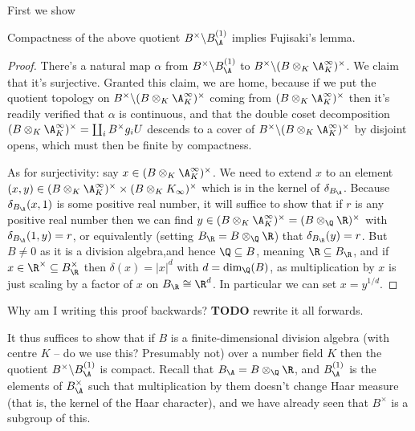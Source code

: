 First we show
\begin{lemma}
  \label{FiniteAdeleRing.DivisionAlgebra.finite_doset_of_compact_quotient}
  Compactness of the above quotient $B^\times\backslash B_{\A}^{(1)}$ implies Fujisaki's lemma.
\end{lemma}
\begin{proof}
  There's a natural map $\alpha$ from $B^\times\backslash B_{\A}^{(1)}$ to
  $B^\times\backslash (B\otimes_K \A_K^\infty)^\times$. We claim that it's
  surjective. Granted this claim, we are home, because if we put the quotient
  topology on $B^\times\backslash (B\otimes_K \A_K^\infty)^\times$ coming from
  $(B\otimes_K \A_K^\infty)^\times$ then it's readily verified that $\alpha$
  is continuous, and that the double coset decomposition
  $(B\otimes_K \A_K^\infty)^\times=\coprod_i B^\times g_i U$ descends to a
  cover of $B^\times\backslash (B\otimes_K \A_K^\infty)^\times$ by disjoint opens,
  which must then be finite by compactness.

  As for surjectivity: say $x\in (B\otimes_K \A_K^\infty)^\times$. We need to extend
  $x$ to an element $(x,y)\in (B\otimes_K \A_K^\infty)^\times\times(B\otimes_K K_\infty)^\times$
  which is in the kernel of $\delta_{B_{\A}}$. Because $\delta_{B_{\A}}(x,1)$ is some positive
  real number, it will suffice to show that if $r$ is any positive real number then we can
  find $y\in (B\otimes_K \A_K^\infty)^\times=(B\otimes_{\Q}\R)^\times$ with $\delta_{B_{\A}}(1,y)=r$,
  or equivalently (setting $B_{\R}=B\otimes_{\Q}\R$) that $\delta_{B_{\R}}(y)=r$.
  But $B\not=0$ as it is a division algebra,and hence $\Q\subseteq B$, meaning
  $\R\subseteq B_{\R}$, and if
  $x\in\R^\times\subseteq B_{\R}^\times$ then $\delta(x)=|x|^d$ with $d=\dim_{\Q}(B)$,
  as multiplication by $x$ is just scaling by a factor of $x$ on $B_{\R}\cong\R^d$.
  In particular we can set $x=y^{1/d}$.
\end{proof}

Why am I writing this proof backwards? {\bf TODO} rewrite it all forwards.

It thus suffices to show that if $B$ is a finite-dimensional division algebra
(with centre $K$ -- do we use this? Presumably not) over a number field $K$
then the quotient $B^\times\backslash B_{\A}^{(1)}$ is compact. Recall that
$B_{\A}=B\otimes_{\Q}\R$, and $B_{\A}^{(1)}$ is the elements of $B_{\A}^\times$
such that multiplication by them doesn't change Haar measure (that is, the
kernel of the Haar character), and we have already seen that $B^\times$ is a subgroup
of this.

